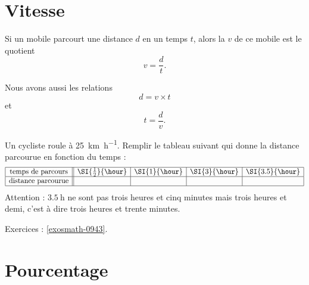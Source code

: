 \section{Vitesse}

\begin{definition}
    Si un mobile parcourt une distance $d$ en un temps $t$, alors la  $v$ de ce mobile est le quotient
    \begin{equation}
        v=\frac{ d }{ t }.
    \end{equation}
\end{definition}

\begin{Aretenir}
    Nous avons aussi les relations
    \begin{equation}
        d=v\times t
    \end{equation}
    et
    \begin{equation}
        t=\frac{ d }{ v }.
    \end{equation}
\end{Aretenir}

\begin{example}
    Un cycliste roule à \SI{25}{\kilo\meter\per\hour}. Remplir le tableau suivant qui donne la distance parcourue en fonction du temps :
    \begin{equation*}
        \begin{array}[]{|c||c|c|c|c|}
            \hline
            \text{temps de parcours}&\SI{\frac{ 1 }{2}}{\hour}&\SI{1}{\hour}&\SI{3}{\hour}&\SI{3.5}{\hour}\\
            \hline
            \text{distance parcourue}&&&&\\
            \hline
        \end{array}
    \end{equation*}
    Attention : \( \SI{3.5}{\hour}\) ne sont pas trois heures et cinq minutes mais trois heures et demi, c'est à dire trois heures et trente minutes.
\end{example}

Exercices : \ref{exosmath-0943}.

\section{Pourcentage}

